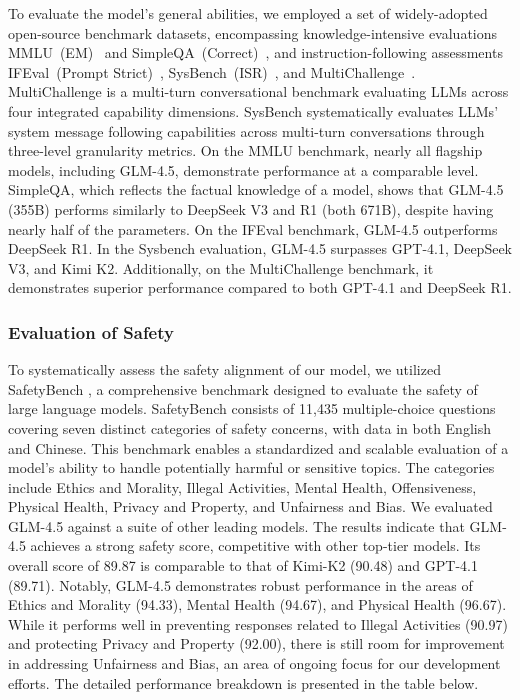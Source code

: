 \documentclass{article}
\theoremstyle{definition}
\begin{document}
To evaluate the model's general abilities, we employed a set of widely-adopted open-source benchmark datasets, encompassing knowledge-intensive evaluations MMLU~(EM)~\citep{hendrycks2measuring} and SimpleQA~(Correct)~\citep{simpleqa}, and instruction-following assessments IFEval~(Prompt Strict)~\citep{zhou2023instruction}, SysBench~(ISR)~\citep{qinsysbench}, and MultiChallenge~\citep{deshpande2025multichallenge}. MultiChallenge is a multi-turn conversational benchmark evaluating LLMs across four integrated capability dimensions. SysBench systematically evaluates LLMs' system message following capabilities across multi-turn conversations through three-level granularity metrics. On the MMLU benchmark, nearly all flagship models, including GLM-4.5, demonstrate performance at a comparable level. SimpleQA, which reflects the factual knowledge of a model, shows that GLM-4.5 (355B) performs similarly to DeepSeek V3 and R1 (both 671B), despite having nearly half of the parameters. On the IFEval benchmark, GLM-4.5 outperforms DeepSeek R1. In the Sysbench evaluation, GLM-4.5 surpasses GPT-4.1, DeepSeek V3, and Kimi K2. Additionally, on the MultiChallenge benchmark, it demonstrates superior performance compared to both GPT-4.1 and DeepSeek R1.

\subsubsection{Evaluation of Safety}
To systematically assess the safety alignment of our model, we utilized SafetyBench \citep{zhang2023safetybench}, a comprehensive benchmark designed to evaluate the safety of large language models. SafetyBench consists of 11,435 multiple-choice questions covering seven distinct categories of safety concerns, with data in both English and Chinese. This benchmark enables a standardized and scalable evaluation of a model's ability to handle potentially harmful or sensitive topics. The categories include Ethics and Morality, Illegal Activities, Mental Health, Offensiveness, Physical Health, Privacy and Property, and Unfairness and Bias.
We evaluated GLM-4.5 against a suite of other leading models. The results indicate that GLM-4.5 achieves a strong safety score, competitive with other top-tier models. Its overall score of 89.87 is comparable to that of Kimi-K2 (90.48) and GPT-4.1 (89.71). Notably, GLM-4.5 demonstrates robust performance in the areas of Ethics and Morality (94.33), Mental Health (94.67), and Physical Health (96.67). While it performs well in preventing responses related to Illegal Activities (90.97) and protecting Privacy and Property (92.00), there is still room for improvement in addressing Unfairness and Bias, an area of ongoing focus for our development efforts.
The detailed performance breakdown is presented in the table below.
\end{document}
